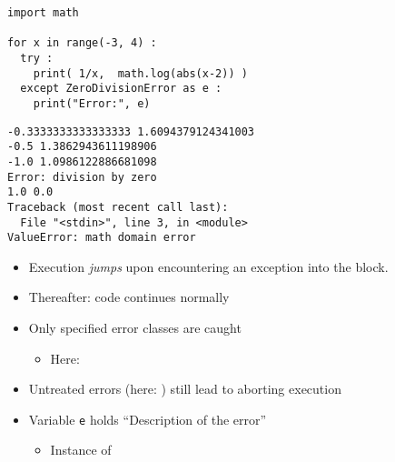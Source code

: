 \begin{frame}[fragile]
%
\begin{tcbraster}[raster columns=2,
                  raster equal height,
                  nobeforeafter,
                  raster column skip=0.5cm]
\begin{codebox}
\begin{verbatim}
import math

for x in range(-3, 4) :
  try :
    print( 1/x,  math.log(abs(x-2)) )
  except ZeroDivisionError as e :
    print("Error:", e)
\end{verbatim}
\end{codebox}
%
\begin{cmdbox}
\begin{verbatim}
-0.3333333333333333 1.6094379124341003
-0.5 1.3862943611198906
-1.0 1.0986122886681098
Error: division by zero
1.0 0.0
Traceback (most recent call last):
  File "<stdin>", line 3, in <module>
ValueError: math domain error
\end{verbatim}
\end{cmdbox}
\end{tcbraster}
%
\begin{center}
\begin{itemize}
\item[\Thus] Execution \emph{jumps} upon encountering an exception into the  block.
\item[\Thus] Thereafter: code continues normally
\item[\Thus] Only specified error classes are caught
	\begin{itemize}
	\item[\thus] Here: 
	\end{itemize}
\item[\Thus] Untreated errors (here: ) still lead to aborting execution
\item[\Thus] Variable \texttt{e} holds \enquote{Description of the error}
	\begin{itemize}
	\item[\thus] Instance of 
	\end{itemize}
\end{itemize}
\end{center}
%
\end{frame}


